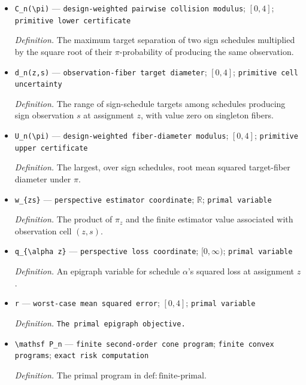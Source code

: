\documentclass{article}
\begin{document}
\begin{itemize}
  \item \texttt{C\_\allowbreak{}n(\textbackslash{}\allowbreak{}pi)} --- \texttt{design-\allowbreak{}weighted pairwise collision modulus}; \([0,4]\); \texttt{primitive lower certificate}
  \par\smallskip\noindent\emph{Definition.} The maximum target separation of two sign schedules multiplied by the square root of their \(\pi\)-probability of producing the same observation.
  \item \texttt{d\_\allowbreak{}n(z,\allowbreak{}s)} --- \texttt{observation-\allowbreak{}fiber target diameter}; \([0,4]\); \texttt{primitive cell uncertainty}
  \par\smallskip\noindent\emph{Definition.} The range of sign-schedule targets among schedules producing sign observation \(s\) at assignment \(z\), with value zero on singleton fibers.
  \item \texttt{U\_\allowbreak{}n(\textbackslash{}\allowbreak{}pi)} --- \texttt{design-\allowbreak{}weighted fiber-\allowbreak{}diameter modulus}; \([0,4]\); \texttt{primitive upper certificate}
  \par\smallskip\noindent\emph{Definition.} The largest, over sign schedules, root mean squared target-fiber diameter under \(\pi\).
  \item \texttt{w\_\allowbreak{}\{zs\}\allowbreak{}} --- \texttt{perspective estimator coordinate}; \(\mathbb R\); \texttt{primal variable}
  \par\smallskip\noindent\emph{Definition.} The product of \(\pi_z\) and the finite estimator value associated with observation cell \((z,s)\).
  \item \texttt{q\_\allowbreak{}\{\textbackslash{}\allowbreak{}alpha z\}\allowbreak{}} --- \texttt{perspective loss coordinate}; \([0,\infty)\); \texttt{primal variable}
  \par\smallskip\noindent\emph{Definition.} An epigraph variable for schedule \(\alpha\)'s squared loss at assignment \(z\).
  \item \texttt{r} --- \texttt{worst-\allowbreak{}case mean squared error}; \([0,4]\); \texttt{primal variable}
  \par\smallskip\noindent\emph{Definition.} \texttt{The primal epigraph objective.}
  \item \texttt{\textbackslash{}\allowbreak{}mathsf P\_\allowbreak{}n} --- \texttt{finite second-\allowbreak{}order cone program}; \texttt{finite convex programs}; \texttt{exact risk computation}
  \par\smallskip\noindent\emph{Definition.} The primal program in \(\mathrm{def{:}finite\text{-}primal}\).

\end{itemize}
\end{document}
